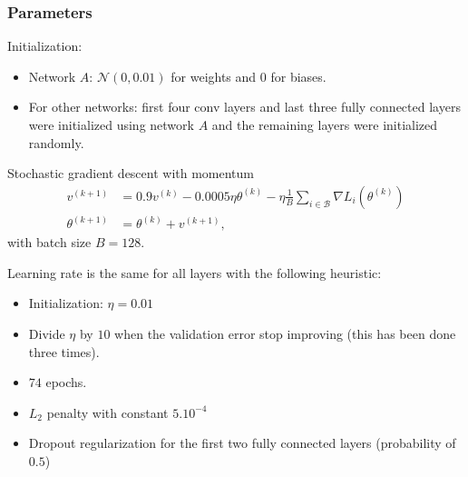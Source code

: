 \begin{frame}
	\frametitle{Parameters}
	
	Initialization: 
	\begin{itemize}
		\item Network $A$: $\mathcal{N}(0, 0.01)$ for weights and $0$ for biases. 
		\item For other networks: first four conv layers and last three fully connected layers were initialized using network $A$ and the remaining layers were initialized randomly. 
	\end{itemize}
	
	
	
	
	\begin{block}{Stochastic gradient descent with momentum}
		\begin{align*}
			v^{(k+1)} & = 0.9 v^{(k)} - 0.0005 \eta \theta^{(k)} - \eta \frac{1}{B} \sum_{i \in \mathcal{B}} \nabla L_i (\theta^{(k)})\\
			\theta^{(k+1)} & = \theta^{(k)} + v^{(k+1)},
		\end{align*}	
		with batch size $B= 128$. 
	\end{block}
	
	
	
	Learning rate is the same for all layers with the following heuristic: 
	\begin{itemize}
		\item Initialization: $\eta = 0.01$
		\item Divide $\eta$ by $10$ when the validation error stop improving
		(this has been done three times).
		\item $74$ epochs.
	\end{itemize}
	
	\begin{itemize}
		\item $L_2$ penalty with constant $5.10^{-4}$
		\item Dropout regularization for the first two fully connected layers (probability of $0.5$)
	\end{itemize}
\end{frame}



